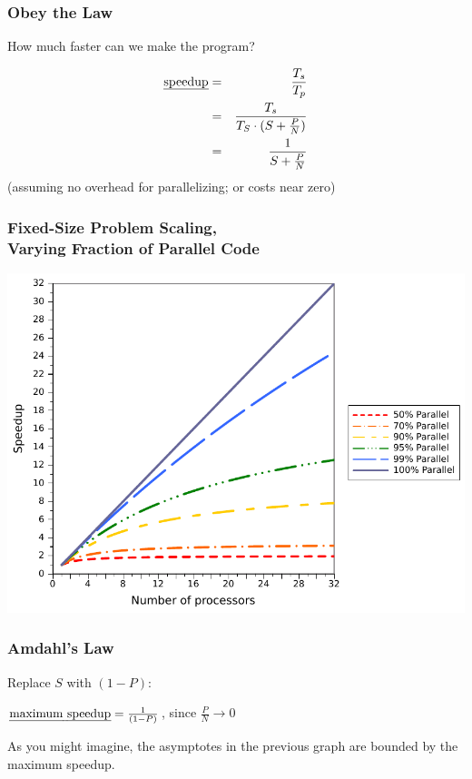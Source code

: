 \begin{frame}
  \frametitle{Obey the Law}

  \hspace*{3em} How much faster can we make the program?

  \begin{eqnarray*}
  \mbox{\em speedup} &=& \frac{T_s}{T_p}\\
                     &=& \frac{T_s}{T_S \cdot (S + \frac{P}{N})}\\
                     &=& \frac{1}{S + \frac{P}{N}}
  \end{eqnarray*}
  \vfill
  \hspace*{3em} (assuming no overhead for parallelizing; or costs near
  zero)

\end{frame}

\begin{frame}
  \frametitle{Fixed-Size Problem Scaling, \\ Varying Fraction of Parallel Code}

  \begin{center}
    \hspace*{2em}\includegraphics[scale=0.68]{images/parallel-scaling.pdf}
  \end{center}
\end{frame}


\begin{frame}
  \frametitle{Amdahl's Law}

 \hspace*{2em}Replace $S$ with $(1 - P)$:

  \begin{center}
  \end{center}
  \vfill
  \begin{center}
    $\mbox{\em maximum speedup} = \frac{1}{(1 - P)}$, since $\frac{P}{N} \rightarrow 0$
  \end{center}

As you might imagine, the asymptotes in the previous graph are bounded by the
  maximum speedup.
\end{frame}

